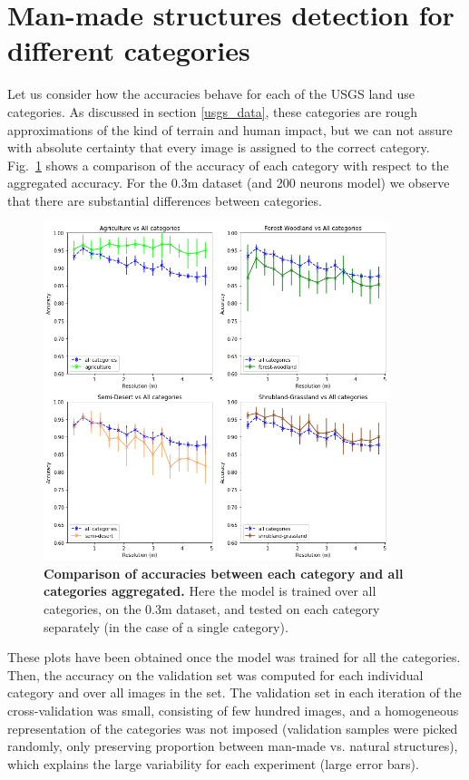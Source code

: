 \section{Man-made structures detection for different categories}

Let us consider how the accuracies behave for each of the USGS land use categories. As discussed in section \ref{usgs_data}, these categories are rough approximations of the kind of terrain and human impact, but we can not assure with absolute certainty that every image is assigned to the correct category. Fig.~\ref{fig:acc_by_cat_03m} shows a comparison of the accuracy of each category with respect to the aggregated accuracy. For the 0.3m dataset (and 200 neurons model) we observe that there are substantial differences between categories. 

\begin{figure}[h!]
	\centering
	\includegraphics[width=0.9\textwidth]{Figures/results/acc_res_by_category_03m.png}
	\captionsetup{width=1\linewidth}
	\caption{\textbf{Comparison of accuracies between each category and all categories aggregated.} Here the model is trained over all categories, on the 0.3m dataset, and tested on each category separately (in the case of a single category).}
	\label{fig:acc_by_cat_03m}
\end{figure}

These plots have been obtained once the model was trained for all the categories. Then, the accuracy on the validation set was computed for each individual category and over all images in the set. The validation set in each iteration of the cross-validation was small, consisting of few hundred images, and a homogeneous representation of the categories was not imposed (validation samples were picked randomly, only preserving proportion between man-made vs. natural structures), which explains the large variability for each experiment (large error bars).

